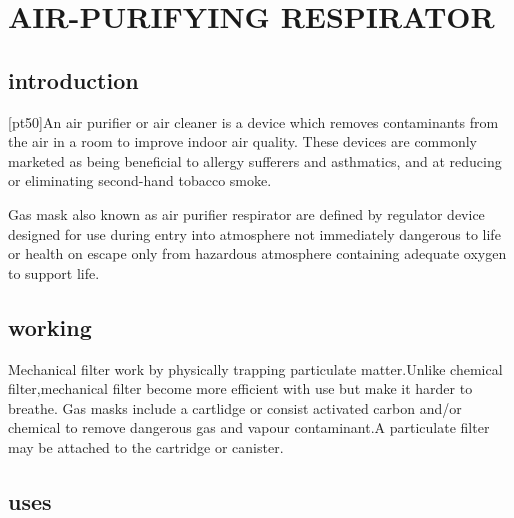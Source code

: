 \documentclass{article}
\begin{document}
\section[pt100]{AIR-PURIFYING RESPIRATOR}








\subsection{introduction}









[pt50]An air purifier or air cleaner is a device which removes contaminants from the air in a room to improve indoor air quality. These devices are commonly marketed as being beneficial to allergy sufferers and asthmatics, and at reducing or eliminating second-hand tobacco smoke.


Gas mask also known as air purifier respirator are defined by regulator device designed for use during entry into atmosphere not immediately dangerous to life or health on escape only from hazardous atmosphere containing
adequate oxygen to support life.










\subsection{working}





Mechanical filter work by physically
trapping particulate matter.Unlike chemical filter,mechanical filter become
more efficient with use but make it harder to breathe.
Gas masks include a cartlidge or consist activated carbon and/or chemical
to remove dangerous gas and vapour contaminant.A particulate filter may
be attached to the cartridge or canister.















\subsection{uses}
\end{document}
